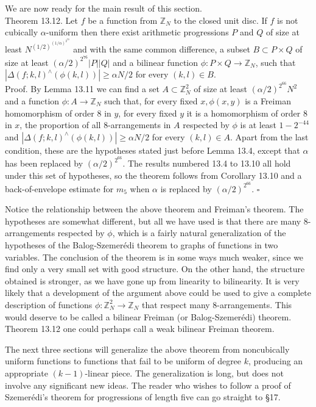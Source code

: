 \documentclass[10pt]{article}
\begin{document}
We are now ready for the main result of this section.\\
Theorem 13.12. Let $f$ be a function from $\mathbb{Z}_{N}$ to the closed unit disc. If $f$ is not cubically $\alpha$-uniform then there exist arithmetic progressions $P$ and $Q$ of size at least $N^{(1 / 2)^{(1 / \alpha)^{2^{70}}}}$ and with the same common difference, a subset $B \subset P \times Q$ of size at least $(\alpha / 2)^{2^{76}}|P||Q|$ and a bilinear function $\phi: P \times Q \rightarrow \mathbb{Z}_{N}$, such that $\left|\Delta(f ; k, l)^{\wedge}(\phi(k, l))\right| \geqslant \alpha N / 2$ for every $(k, l) \in B$.\\
Proof. By Lemma 13.11 we can find a set $A \subset \mathbb{Z}_{N}^{2}$ of size at least $(\alpha / 2)^{2^{66}} N^{2}$ and a function $\phi: A \rightarrow \mathbb{Z}_{N}$ such that, for every fixed $x, \phi(x, y)$ is a Freiman homomorphism of order 8 in $y$, for every fixed $y$ it is a homomorphism of order 8 in $x$, the proportion of all 8-arrangements in $A$ respected by $\phi$ is at least $1-2^{-44}$ and $\left|\Delta(f ; k, l)^{\wedge}(\phi(k, l))\right| \geqslant \alpha N / 2$ for every $(k, l) \in A$. Apart from the last condition, these are the hypotheses stated just before Lemma 13.4, except that $\alpha$ has been replaced by $(\alpha / 2)^{2^{66}}$. The results numbered 13.4 to 13.10 all hold under this set of hypotheses, so the theorem follows from Corollary 13.10 and a back-of-envelope estimate for $m_{5}$ when $\alpha$ is replaced by $(\alpha / 2)^{2^{66}}$. \(\square\)

Notice the relationship between the above theorem and Freiman's theorem. The hypotheses are somewhat different, but all we have used is that there are many 8-arrangements respected by $\phi$, which is a fairly natural generalization of the hypotheses of the Balog-Szemerédi theorem to graphs of functions in two variables. The conclusion of the theorem is in some ways much weaker, since we find only a very small set with good structure. On the other hand, the structure obtained is stronger, as we have gone up from linearity to bilinearity. It is very likely that a development of the argument above could be used to give a complete description of functions $\phi: \mathbb{Z}_{N}^{2} \rightarrow \mathbb{Z}_{N}$ that respect many 8-arrangements. This would deserve to be called a bilinear Freiman (or Balog-Szemerédi) theorem. Theorem 13.12 one could perhaps call a weak bilinear Freiman theorem.

The next three sections will generalize the above theorem from noncubically uniform functions to functions that fail to be uniform of degree $k$, producing an appropriate $(k-1)$-linear piece. The generalization is long, but does not involve any significant new ideas. The reader who wishes to follow a proof of Szemerédi's theorem for progressions of length five can go straight to §17.
\end{document}
